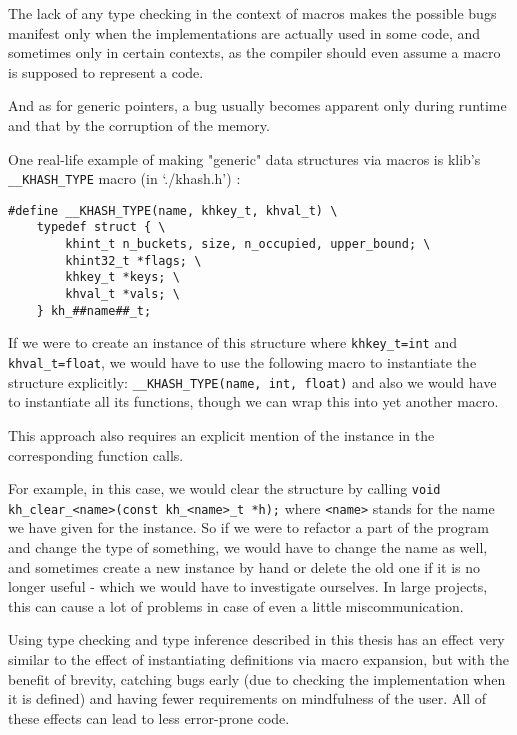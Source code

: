 The lack of any type checking in the context of macros makes the possible bugs manifest only when the implementations are actually used in some code, and sometimes only in certain contexts, as the compiler should even assume a macro is supposed to represent a code.

And as for generic pointers, a bug usually becomes apparent only during runtime and that by the corruption of the memory.

One real-life example of making "generic" data structures via macros is klib's \lstinline{__KHASH_TYPE} macro (in `./khash.h') \cite{attractivechaos2020klib}:

\begin{lstlisting}
#define __KHASH_TYPE(name, khkey_t, khval_t) \
    typedef struct { \
        khint_t n_buckets, size, n_occupied, upper_bound; \
        khint32_t *flags; \
        khkey_t *keys; \
        khval_t *vals; \
    } kh_##name##_t;
\end{lstlisting}

If we were to create an instance of this structure where \lstinline{khkey_t=int} and \lstinline{khval_t=float}, we would have to use the following macro to instantiate the structure explicitly: \lstinline{__KHASH_TYPE(name, int, float)} and also we would have to instantiate all its functions, though we can wrap this into yet another macro.

This approach also requires an explicit mention of the instance in the corresponding function calls.

For example, in this case, we would clear the structure by calling
\lstinline{void kh_clear_<name>(const kh_<name>_t *h);} where \lstinline{<name>} stands for the name we have given for the instance. So if we were to refactor a part of the program and change the type of something, we would have to change the name as well, and sometimes create a new instance by hand or delete the old one if it is no longer useful - which we would have to investigate ourselves. In large projects, this can cause a lot of problems in case of even a little miscommunication.

Using type checking and type inference described in this thesis has an effect very similar to the effect of instantiating definitions via macro expansion, but with the benefit of brevity, catching bugs early (due to checking the implementation when it is defined) and having fewer requirements on mindfulness of the user. All of these effects can lead to less error-prone code.

